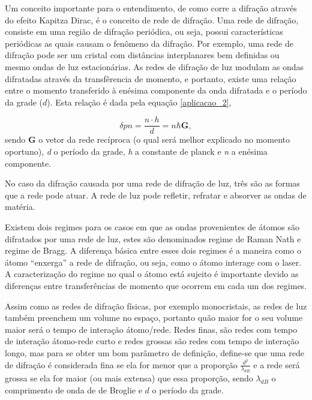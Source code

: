 			\par Um conceito importante para o entendimento, de como corre a difração através do efeito Kapitza Dirac, é o conceito de rede de difração. Uma rede de difração, consiste em uma região de difração periódica\cite{ricardo_5}, ou seja, possui características periódicas as quais causam o fenômeno da difração. Por exemplo, uma rede de difração pode ser um cristal com distâncias interplanares bem definidas ou mesmo ondas de luz estacionárias\cite{ricardo_5}. As redes de difração de luz modulam as ondas difratadas através da transfêrencia de momento, e portanto, existe uma relação entre o momento transferido à enésima componente da onda difratada e o período da grade ($d$). Esta relação é dada pela equação \eqref{aplicacao_2},

			\begin{equation}
				\label{aplicacao_2}
				\delta pn = \frac { n \cdot h } {d} = n \hbar \mathbf {G},
			\end{equation}
			sendo \textbf{G} o vetor da rede recíproca (o qual será melhor explicado no momento oportuno), \textit{d} o período da grade, \textit{h} a constante de planck e \textit{n} a enésima componente\cite{ricardo_5}.
			
			\par No caso da difração causada por uma rede de difração de luz, três são as formas que a rede pode atuar. 
			A rede de luz pode refletir, refratar e absorver as ondas de matéria\cite{ricardo_5}.
			
			\par Existem dois regimes para os casos em que as ondas provenientes de átomos são difratados por uma rede de luz, estes são denominados regime de Raman Nath e regime de Bragg. A diferença básica entre esses dois regimes é a maneira como o átomo “enxerga” a rede de difração, ou seja, como o átomo interage com o laser\cite{ricardo_5}. A caracterização do regime no qual o átomo está sujeito é importante devido as diferenças entre transferências de momento que ocorrem em cada um dos regimes.
			
			\par Assim como as redes de difração físicas, por exemplo monocristais, as redes de luz também preenchem um volume no espaço, portanto quão maior for o seu volume maior será o tempo de interação átomo/rede. Redes finas, são redes com tempo de interação átomo-rede curto e redes grossas são redes com tempo de interação longo, mas para se obter um bom parâmetro de definição, define-se que uma rede de difração é considerada fina se ela for menor que a proporção  $\frac{d^2}{\lambda_{dB}}$ e a rede será grossa se ela for maior (ou mais extensa) que essa proporção, sendo $\lambda_{dB}$ o comprimento de onda de de Broglie e $d$ o período da grade\cite{ricardo_5}.
			
